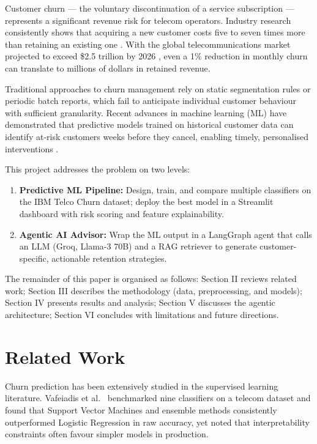 \documentclass[conference]{IEEEtran}
\begin{document}
Customer churn — the voluntary discontinuation of a service subscription
— represents a significant revenue risk for telecom operators. Industry
research consistently shows that acquiring a new customer costs five to
seven times more than retaining an existing one \cite{reichheld1990zero}.
With the global telecommunications market projected to exceed
\$2.5 trillion by 2026 \cite{statista2024telecom}, even a 1\% reduction
in monthly churn can translate to millions of dollars in retained revenue.

Traditional approaches to churn management rely on static segmentation
rules or periodic batch reports, which fail to anticipate individual
customer behaviour with sufficient granularity. Recent advances in
machine learning (ML) have demonstrated that predictive models trained on
historical customer data can identify at-risk customers weeks before they
cancel, enabling timely, personalised interventions
\cite{vafeiadis2015comparison}.

This project addresses the problem on two levels:

\begin{enumerate}
  \item \textbf{Predictive ML Pipeline:} Design, train, and
        compare multiple classifiers on the IBM Telco Churn dataset;
        deploy the best model in a Streamlit dashboard with risk scoring
        and feature explainability.
  \item \textbf{Agentic AI Advisor:} Wrap the ML output in
        a LangGraph agent that calls an LLM (Groq, Llama-3 70B) and a RAG
        retriever to generate customer-specific, actionable retention
        strategies.
\end{enumerate}

The remainder of this paper is organised as follows: Section II reviews
related work; Section III describes the methodology (data, preprocessing,
and models); Section IV presents results and analysis; Section V discusses
the agentic architecture; Section VI concludes with
limitations and future directions.

\section{Related Work}

Churn prediction has been extensively studied in the supervised learning
literature. Vafeiadis et al.~\cite{vafeiadis2015comparison} benchmarked
nine classifiers on a telecom dataset and found that Support Vector
Machines and ensemble methods consistently outperformed Logistic
Regression in raw accuracy, yet noted that interpretability constraints
often favour simpler models in production.
\end{document}
